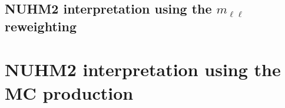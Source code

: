 
\subsection{NUHM2 interpretation using the $m_{\ell \ell}$ reweighting}
\label{subsec:results_mll_reweighting_interpretation}


\section{NUHM2 interpretation using the MC production}
\label{sec:results_mc_production_interpretation}